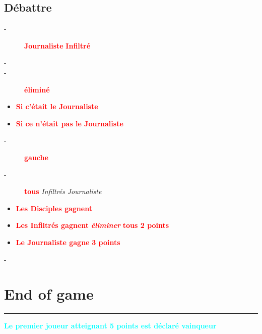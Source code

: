 \documentclass{article}%
\begin{document}
\subsection{ Débattre
}%
\label{subsec:Dbattre}%
\begin{description}%
\item[{-} ]%
%
\textcolor{red}{%
\textbf{Journaliste}%
}%
\textit{ }%
\textcolor{red}{%
\textbf{Infiltré}%
}%
\item[{-} ]%
%
\item[{-} ]%
%
\textcolor{red}{%
\textbf{éliminé}%
}%
\textit{ }%
\end{description}%
\begin{itemize}%
\item%
%
\textcolor{red}{%
\textbf{Si c’était le Journaliste}%
}%
\item%
%
\textcolor{red}{%
\textbf{Si ce n’était pas le Journaliste}%
}%
\end{itemize}%
\begin{description}%
\item[{-} ]%
%
\textcolor{red}{%
\textbf{gauche}%
}%
\textit{ }%
\item[{-} ]%
%
\textcolor{red}{%
\textbf{tous}%
}%
\textit{ }%
\textit{Infiltrés}%
\textit{ }%
\textit{Journaliste}%
\textit{ }%
\end{description}%
\begin{itemize}%
\item%
%
\textcolor{red}{%
\textbf{Les Disciples gagnent}%
}%
\textit{ }%
\item%
%
\textcolor{red}{%
\textbf{Les Infiltrés gagnent}%
}%
\textit{ }%
\textcolor{red}{\textbf{\textit{éliminer}}}%
\textit{ }%
\textcolor{red}{%
\textbf{tous 2 points}%
}%
\textit{ }%
\item%
%
\textcolor{red}{%
\textbf{Le Journaliste gagne}%
}%
\textit{ }%
\textcolor{red}{%
\textbf{3 points}%
}%
\end{itemize}%
\begin{description}%
\item[{-} ]%
%
\end{description}

%
\sectionfont{\color{cyan}}%
\subsectionfont{\color{cyan}}%
\subsubsectionfont{\color{cyan}}%
\section{ End of game
}%
\label{sec:Endofgame}%
\textcolor{cyan}{\rule{18cm}{0.07cm}}\break%
\textcolor{cyan}{%
\textbf{Le premier joueur atteignant 5 points est déclaré vainqueur}%
}

%
\end{document}
